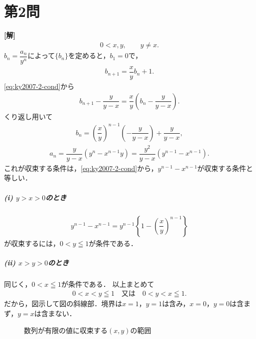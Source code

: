 \documentclass[../main.tex]{subfiles}
\begin{document}
\section*{第2問}

{\bf [解]}
\begin{align}0<x,y,\qquad y\ne x.\label{eq:ky2007-2-cond}
\end{align}
$b_n=\dfrac{a_n}{y^n}$によって$\{b_n\}$を定めると，$b_1=0$で，
\begin{align}b_{n+1}=\dfrac{x}{y}b_n+1.
\end{align}
\cref{eq:ky2007-2-cond}から
\begin{align}
  b_{n+1}-\dfrac{y}{y-x}=\dfrac{x}{y}\left(b_n-\dfrac{y}{y-x}\right).
\end{align}
くり返し用いて
\begin{align}
  b_n=\left(\dfrac{x}{y}\right)^{n-1}\left(-\dfrac{y}{y-x}\right)+\dfrac{y}{y-x},
\end{align}
\begin{align}
  a_n=\dfrac{y}{y-x}\left(y^n-x^{n-1}y\right)
  =\dfrac{y^2}{y-x}\left(y^{n-1}-x^{n-1}\right).
\end{align}
これが収束する条件は，\cref{eq:ky2007-2-cond}から，$y^{n-1}-x^{n-1}$が収束する条件と等しい．
\subparagraph{(i) $y>x>0$のとき}
\begin{align}
  y^{n-1}-x^{n-1}=y^{n-1}\left\{1-\left(\dfrac{x}{y}\right)^{n-1}\right\}
\end{align}
が収束するには，$0<y\leqq1$が条件である．
\subparagraph{(ii) $x>y>0$のとき}
同じく，$0<x\leqq1$が条件である．
\casesend
以上まとめて
\begin{align}0<x<y\leqq1\quad\text{又は}\quad0<y<x\leqq1.
\end{align}
だから，図示して図の斜線部．境界は$x=1$，$y=1$は含み，$x=0$，$y=0$は含まず，$y=x$は含まない．
\begin{figure}[H]
  \begin{center}
  \end{center}
  \caption{数列が有限の値に収束する$(x,y)$の範囲}
\end{figure}
\newpage
\end{document}

